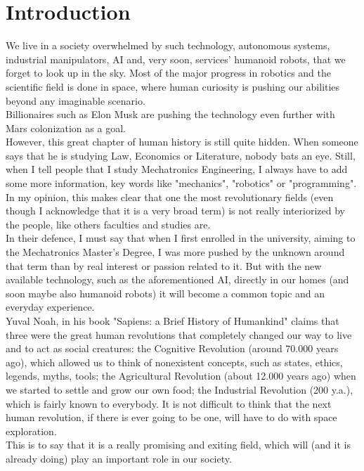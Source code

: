 \documentclass[a4paper,12pt,oneside]{report}
\begin{document}
\chapter*{Introduction}
\pagestyle{styleint}
We live in a society overwhelmed by such technology, autonomous systems, industrial manipulators, AI and, very soon, services' humanoid robots, that we forget to look up in the sky. Most of the major progress in robotics and the scientific field is done in space, where human curiosity is pushing our abilities beyond any imaginable scenario.\\
Billionaires such as Elon Musk are pushing the technology even further with Mars colonization as a goal.\\
However, this great chapter of human history is still quite hidden. When someone says that he is studying Law, Economics or Literature, nobody bats an eye. Still, when I tell people that I study Mechatronics Engineering, I always have to add some more information, key words like "mechanics", "robotics" or "programming". In my opinion, this makes clear that one the most revolutionary fields (even though I acknowledge that it is a very broad term) is not really interiorized by the people, like others faculties and studies are.\\
In their defence, I must say that when I first enrolled in the university, aiming to the Mechatronics Master's Degree, I was more pushed by the unknown around that term than by real interest or passion related to it. But with the new available technology, such as the aforementioned AI, directly in our homes (and soon maybe also humanoid robots) it will become a common topic and an everyday experience.\\
Yuval Noah, in his book "Sapiens: a Brief History of Humankind" \cite{twentyseven} claims that three were the great human revolutions that completely changed our way to live and to act as social creatures: the Cognitive Revolution (around 70.000 years ago), which allowed us to think of nonexistent concepts, such as states, ethics, legends, myths, tools; the Agricultural Revolution (about 12.000 years ago) when we started to settle and grow our own food; the Industrial Revolution (200 y.a.), which is fairly known to everybody. It is not difficult to think that the next human revolution, if there is ever going to be one, will have to do with space exploration.\\
This is to say that it is a really promising and exiting field, which will (and it is already doing) play an important role in our society.\\
\end{document}
